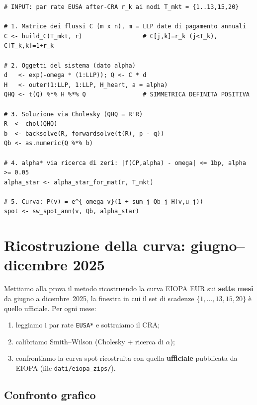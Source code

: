 \documentclass[11pt,a4paper]{article}
\theoremstyle{plain}
\theoremstyle{definition}
\theoremstyle{remark}
\newcommand{\CRA}{\ensuremath{\mathrm{CRA}}}
\begin{document}
\begin{algobox}
\begin{Verbatim}[fontsize=\small]
# INPUT: par rate EUSA after-CRA r_k ai nodi T_mkt = {1..13,15,20}

# 1. Matrice dei flussi C (m x n), m = LLP date di pagamento annuali
C <- build_C(T_mkt, r)                 # C[j,k]=r_k (j<T_k), C[T_k,k]=1+r_k

# 2. Oggetti del sistema (dato alpha)
d   <- exp(-omega * (1:LLP)); Q <- C * d
H   <- outer(1:LLP, 1:LLP, H_heart, a = alpha)
QHQ <- t(Q) %*% H %*% Q                # SIMMETRICA DEFINITA POSITIVA

# 3. Soluzione via Cholesky (QHQ = R'R)
R  <- chol(QHQ)
b  <- backsolve(R, forwardsolve(t(R), p - q))
Qb <- as.numeric(Q %*% b)

# 4. alpha* via ricerca di zeri: |f(CP,alpha) - omega| <= 1bp, alpha >= 0.05
alpha_star <- alpha_star_for_mat(r, T_mkt)

# 5. Curva: P(v) = e^{-omega v}(1 + sum_j Qb_j H(v,u_j))
spot <- sw_spot_ann(v, Qb, alpha_star)
\end{Verbatim}
\end{algobox}

\section{Ricostruzione della curva: giugno--dicembre 2025}

Mettiamo alla prova il metodo ricostruendo la curva EIOPA EUR sui \textbf{sette mesi} da
giugno a dicembre~2025, la finestra in cui il set di scadenze $\{1,\dots,13,15,20\}$ \`e quello
ufficiale. Per ogni mese:
\begin{enumerate}
  \item leggiamo i par rate \texttt{EUSA*} e sottraiamo il $\CRA$;
  \item calibriamo Smith--Wilson (Cholesky + ricerca di $\alpha$);
  \item confrontiamo la curva spot ricostruita con quella \textbf{ufficiale} pubblicata da
        EIOPA (file \texttt{dati/eiopa\_zips/}).
\end{enumerate}

\subsection{Confronto grafico}
\end{document}
